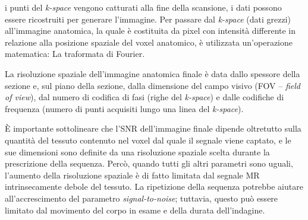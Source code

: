 \documentclass[leqno,10pt,twocolumn,a4paper]{article}
\begin{document}
	i punti del \textit{k-space} vengono catturati alla fine della scansione, i dati possono essere ricostruiti per generare l'immagine. Per passare dal \textit{k-space} (dati grezzi) all'immagine anatomica,
	la quale è costituita da pixel con intensità differente in relazione alla posizione spaziale del voxel anatomico, è utilizzata un'operazione matematica: La traformata di Fourier. 
	\par La risoluzione spaziale dell'immagine anatomica finale è data dallo spessore della sezione e, sul piano della sezione, dalla dimensione del campo visivo (FOV -- \textit{field of view}), dal numero di 
	codifica di fasi (righe del \textit{k-space}) e dalle codifiche di frequenza (numero di punti acquisiti lungo una linea del \textit{k-space}). \par È importante sottolineare che l'SNR dell'immagine finale 
	dipende oltretutto sulla quantità del tessuto contenuto nel voxel dal quale il segnale viene captato, e le sue dimensioni sono definite da una risoluzione spaziale scelta durante la prescrizione della
	sequenza. Percò, quando tutti gli altri parametri sono uguali, l'aumento della risoluzione spaziale è di fatto limitata dal segnale MR intrinsecamente debole del tessuto. La ripetizione della sequenza
	potrebbe aiutare all'accrescimento del parametro \textit{signal-to-noise}; tuttavia, questo può essere limitato dal movimento del corpo in esame e della durata dell'indagine.
\end{document}
